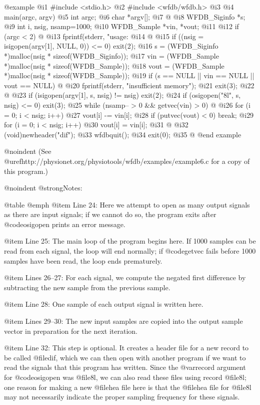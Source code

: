 {{{{{{{{{@example
 @i{1}  #include <stdio.h>
 @i{2}  #include <wfdb/wfdb.h>
 @i{3}  
 @i{4}  main(argc, argv)
 @i{5}  int argc;
 @i{6}  char *argv[];
 @i{7}  @{
 @i{8}      WFDB_Siginfo *s;
 @i{9}      int i, nsig, nsamp=1000;
@i{10}      WFDB_Sample *vin, *vout;
@i{11}  
@i{12}      if (argc < 2) @{
@i{13}          fprintf(stderr, "usage: %
@i{14}      @}
@i{15}      if ((nsig = isigopen(argv[1], NULL, 0)) <= 0) exit(2);
@i{16}      s = (WFDB_Siginfo *)malloc(nsig * sizeof(WFDB_Siginfo));
@i{17}      vin = (WFDB_Sample *)malloc(nsig * sizeof(WFDB_Sample));
@i{18}      vout = (WFDB_Sample *)malloc(nsig * sizeof(WFDB_Sample));
@i{19}      if (s == NULL || vin == NULL || vout == NULL) @{
@i{20}          fprintf(stderr, "insufficient memory\n");
@i{21}          exit(3);
@i{22}      @}
@i{23}      if (isigopen(argv[1], s, nsig) != nsig) exit(2);
@i{24}      if (osigopen("8l", s, nsig) <= 0) exit(3);
@i{25}      while (nsamp-- > 0 && getvec(vin) > 0) @{
@i{26}          for (i = 0; i < nsig; i++)
@i{27}              vout[i] -= vin[i];
@i{28}          if (putvec(vout) < 0) break;
@i{29}          for (i = 0; i < nsig; i++)
@i{30}              vout[i] = vin[i];
@i{31}      @}
@i{32}      (void)newheader("dif");
@i{33}      wfdbquit();
@i{34}      exit(0);
@i{35}  @}
@end example

@noindent
(See @uref{http://physionet.org/physiotools/wfdb/examples/example6.c}
for a copy of this program.)

@noindent
@strong{Notes:}

@table @emph
@item Line 24:
Here we attempt to open as many output signals as there are input
signals; if we cannot do so, the program exits after @code{osigopen}
prints an error message.

@item Line 25:
The main loop of the program begins here.  If 1000 samples can be read
from each signal, the loop will end normally; if @code{getvec} fails
before 1000 samples have been read, the loop ends prematurely.

@item Lines 26--27:
For each signal, we compute the negated first difference by subtracting
the new sample from the previous sample.

@item Line 28:
One sample of each output signal is written here.

@item Lines 29--30:
The new input samples are copied into the output sample vector in preparation
for the next iteration.

@item Line 32:
This step is optional.  It creates a header file for a new record
to be called @file{dif}, which we can then open with another program if
we want to read the signals that this program has written.  Since the
@var{record} argument for @code{osigopen} was @file{8l}, we can also
read these files using record @file{8l}; one reason for making a new
@file{hea} file here is that the @file{hea} file for @file{8l} may
not necessarily indicate the proper sampling frequency for these
signals.

}}}}}}}}}
